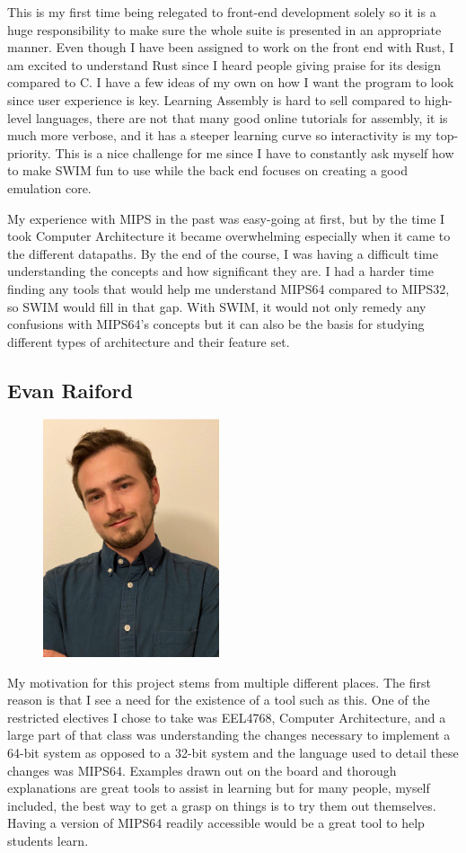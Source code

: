 \documentclass[
    paper=letter,
    parskip=half,
    fontsize=12pt,
    titlepage=firstiscover,
    toc=bibliography,
    numbers=endperiod
]{scrartcl}
\begin{document}
This is my first time being relegated to front-end development solely so it is a huge responsibility to make sure the whole suite is presented in an appropriate manner. Even though I have been assigned to work on the front end with Rust, I am excited to understand Rust since I heard people giving praise for its design compared to C. I have a few ideas of my own on how I want the program to look since user experience is key. Learning Assembly is hard to sell compared to high-level languages, there are not that many good online tutorials for assembly, it is much more verbose, and it has a steeper learning curve so interactivity is my top-priority. This is a nice challenge for me since I have to constantly ask myself how to make SWIM fun to use while the back end focuses on creating a good emulation core.

My experience with MIPS in the past was easy-going at first, but by the time I took Computer Architecture it became overwhelming especially when it came to the different datapaths. By the end of the course, I was having a difficult time understanding the concepts and how significant they are. I had a harder time finding any tools that would help me understand MIPS64 compared to MIPS32, so SWIM would fill in that gap. With SWIM, it would not only remedy any confusions with MIPS64's concepts but it can also be the basis for studying different types of architecture and their feature set.


\subsection{Evan Raiford}
\begin{figure}[H]
    \includegraphics[height=7cm]{profile-evan}
\end{figure}

My motivation for this project stems from multiple different places. The first reason is that I see a need for the existence of a tool such as this. One of the restricted electives I chose to take was EEL4768, Computer Architecture, and a large part of that class was understanding the changes necessary to implement a 64-bit system as opposed to a 32-bit system and the language used to detail these changes was MIPS64. Examples drawn out on the board and thorough explanations are great tools to assist in learning but for many people, myself included, the best way to get a grasp on things is to try them out themselves. Having a version of MIPS64 readily accessible would be a great tool to help students learn.
\end{document}

